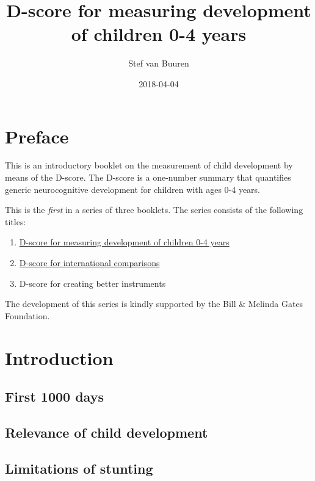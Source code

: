 \documentclass[]{book}
\title{D-score for measuring development of children 0-4 years}
\author{Stef van Buuren}
\date{2018-04-04}
\providecommand{\tightlist}{%
  \setlength{\itemsep}{0pt}\setlength{\parskip}{0pt}}
\begin{document}
\maketitle

{
\setcounter{tocdepth}{1}
\tableofcontents
}
\chapter*{Preface}\label{preface}

This is an introductory booklet on the measurement of child development
by means of the D-score. The D-score is a one-number summary that
quantifies generic neurocognitive development for children with ages 0-4
years.

This is the \emph{first} in a series of three booklets. The series
consists of the following titles:

\begin{enumerate}
\def\labelenumi{\arabic{enumi}.}
\tightlist
\item
  \href{https://stefvanbuuren.github.io/dbook1/}{D-score for measuring
  development of children 0-4 years}
\item
  \href{https://stefvanbuuren.github.io/dbook2/}{D-score for
  international comparisons}
\item
  D-score for creating better instruments
\end{enumerate}

The development of this series is kindly supported by the Bill \&
Melinda Gates Foundation.

\chapter{Introduction}\label{intro}

\section{First 1000 days}\label{first-1000-days}

\section{Relevance of child
development}\label{relevance-of-child-development}

\section{Limitations of stunting}\label{limitations-of-stunting}
\end{document}
